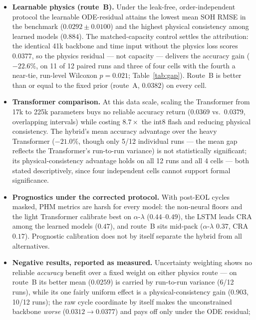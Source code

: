 \begin{itemize}
    \item \textbf{Learnable physics (route~B).} Under the leak-free,
    order-independent protocol the learnable ODE-residual attains the lowest
    mean SOH RMSE in the benchmark ($0.0292 \pm 0.0100$) and the highest
    physical consistency among learned models ($0.884$). The matched-capacity
    control settles the attribution: the identical 41k backbone and time input
    without the physics loss scores $0.0377$, so the physics residual --- not
    capacity --- delivers the accuracy gain ($-22.6\%$, on 11 of 12 paired runs
    and three of four cells with the fourth a near-tie, run-level Wilcoxon
    $p=0.021$; Table~\ref{tab:gap}).
    Route~B is better than or equal to the fixed prior (route~A, $0.0382$) on
    every cell.
    \item \textbf{Transformer comparison.} At this data scale, scaling the
    Transformer from 17k to 225k parameters buys no reliable accuracy return
    ($0.0369$ vs.\ $0.0379$, overlapping intervals) while costing $8.7\times$
    the int8 flash and reducing physical consistency. The hybrid's mean
    accuracy advantage over the heavy Transformer ($-21.0\%$, though only 5/12
    individual runs --- the mean gap reflects the Transformer's run-to-run
    variance) is not
    statistically significant; its physical-consistency advantage holds on all
    12 runs and all 4 cells --- both stated descriptively, since four
    independent cells cannot support formal significance.
    \item \textbf{Prognostics under the corrected protocol.} With post-EOL
    cycles masked, PHM metrics are harsh for every model: the non-neural floors
    and the light Transformer calibrate best on $\alpha$-$\lambda$
    ($0.44$--$0.49$), the LSTM leads CRA among the learned models ($0.47$), and
    route~B sits mid-pack ($\alpha$-$\lambda$ $0.37$, CRA $0.17$). Prognostic
    calibration does not by itself separate the hybrid from all alternatives.
    \item \textbf{Negative results, reported as measured.} Uncertainty
    weighting shows no reliable \emph{accuracy} benefit over a fixed weight on
    either physics route --- on route~B its better mean ($0.0259$) is carried
    by run-to-run variance (6/12 runs), while its one fairly uniform effect is
    a physical-consistency gain ($0.903$, 10/12 runs); the raw cycle
    coordinate by itself makes the unconstrained backbone \emph{worse}
    ($0.0312 \rightarrow 0.0377$) and pays off only under the ODE residual;

\end{itemize}
